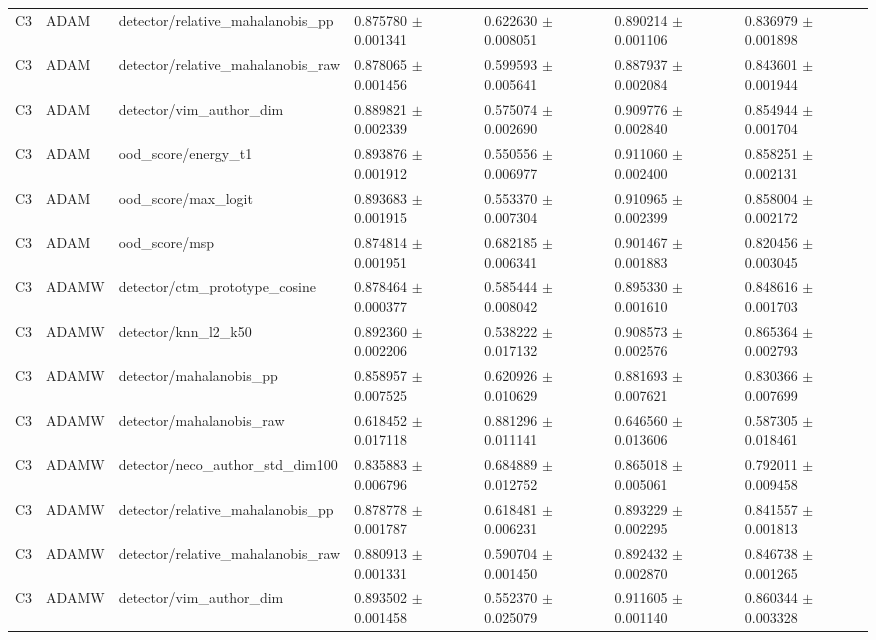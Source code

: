 \begin{longtable}{lllllll}
C3 & ADAM & detector/relative\_mahalanobis\_pp & 0.875780 $\pm$ 0.001341 & 0.622630 $\pm$ 0.008051 & 0.890214 $\pm$ 0.001106 & 0.836979 $\pm$ 0.001898 \\
C3 & ADAM & detector/relative\_mahalanobis\_raw & 0.878065 $\pm$ 0.001456 & 0.599593 $\pm$ 0.005641 & 0.887937 $\pm$ 0.002084 & 0.843601 $\pm$ 0.001944 \\
C3 & ADAM & detector/vim\_author\_dim & 0.889821 $\pm$ 0.002339 & 0.575074 $\pm$ 0.002690 & 0.909776 $\pm$ 0.002840 & 0.854944 $\pm$ 0.001704 \\
C3 & ADAM & ood\_score/energy\_t1 & 0.893876 $\pm$ 0.001912 & 0.550556 $\pm$ 0.006977 & 0.911060 $\pm$ 0.002400 & 0.858251 $\pm$ 0.002131 \\
C3 & ADAM & ood\_score/max\_logit & 0.893683 $\pm$ 0.001915 & 0.553370 $\pm$ 0.007304 & 0.910965 $\pm$ 0.002399 & 0.858004 $\pm$ 0.002172 \\
C3 & ADAM & ood\_score/msp & 0.874814 $\pm$ 0.001951 & 0.682185 $\pm$ 0.006341 & 0.901467 $\pm$ 0.001883 & 0.820456 $\pm$ 0.003045 \\
C3 & ADAMW & detector/ctm\_prototype\_cosine & 0.878464 $\pm$ 0.000377 & 0.585444 $\pm$ 0.008042 & 0.895330 $\pm$ 0.001610 & 0.848616 $\pm$ 0.001703 \\
C3 & ADAMW & detector/knn\_l2\_k50 & 0.892360 $\pm$ 0.002206 & 0.538222 $\pm$ 0.017132 & 0.908573 $\pm$ 0.002576 & 0.865364 $\pm$ 0.002793 \\
C3 & ADAMW & detector/mahalanobis\_pp & 0.858957 $\pm$ 0.007525 & 0.620926 $\pm$ 0.010629 & 0.881693 $\pm$ 0.007621 & 0.830366 $\pm$ 0.007699 \\
C3 & ADAMW & detector/mahalanobis\_raw & 0.618452 $\pm$ 0.017118 & 0.881296 $\pm$ 0.011141 & 0.646560 $\pm$ 0.013606 & 0.587305 $\pm$ 0.018461 \\
C3 & ADAMW & detector/neco\_author\_std\_dim100 & 0.835883 $\pm$ 0.006796 & 0.684889 $\pm$ 0.012752 & 0.865018 $\pm$ 0.005061 & 0.792011 $\pm$ 0.009458 \\
C3 & ADAMW & detector/relative\_mahalanobis\_pp & 0.878778 $\pm$ 0.001787 & 0.618481 $\pm$ 0.006231 & 0.893229 $\pm$ 0.002295 & 0.841557 $\pm$ 0.001813 \\
C3 & ADAMW & detector/relative\_mahalanobis\_raw & 0.880913 $\pm$ 0.001331 & 0.590704 $\pm$ 0.001450 & 0.892432 $\pm$ 0.002870 & 0.846738 $\pm$ 0.001265 \\
C3 & ADAMW & detector/vim\_author\_dim & 0.893502 $\pm$ 0.001458 & 0.552370 $\pm$ 0.025079 & 0.911605 $\pm$ 0.001140 & 0.860344 $\pm$ 0.003328 \\

\end{longtable}
